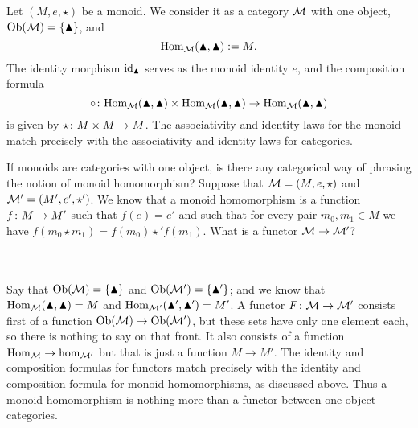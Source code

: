 \documentclass[CT4S-EN-RU]{subfiles}
\begin{document}
\begin{blockENG}
Let $(M,e,\star)$ be a monoid. We consider it as a category $\mathcal{M}$ with one object, $\textnormal{Ob}(\mathcal{M})=\{\blacktriangle\}$, and $$\textnormal{Hom}_\mathcal{M}(\blacktriangle,\blacktriangle):=M.$$ The identity morphism $\textnormal{id}_\blacktriangle$ serves as the monoid identity $e$, and the composition formula $$\circ\colon\textnormal{Hom}_\mathcal{M}(\blacktriangle,\blacktriangle)\times\textnormal{Hom}_\mathcal{M}(\blacktriangle,\blacktriangle)\rightarrow\textnormal{Hom}_\mathcal{M}(\blacktriangle,\blacktriangle)$$ is given by $\star\colon M\times M\rightarrow M$. The associativity and identity laws for the monoid match precisely with the associativity and identity laws for categories.
\end{blockENG}

\begin{blockRUS}
\end{blockRUS}

\begin{blockENG}
If monoids are categories with one object, is there any categorical way of phrasing the notion of monoid homomorphism? Suppose that $\mathcal{M}=(M,e,\star)$ and $\mathcal{M}'=(M',e',\star')$. We know that a monoid homomorphism is a function $f\colon M\rightarrow M'$ such that $f(e)=e'$ and such that for every pair $m_0,m_1\in M$ we have $f(m_0\star m_1)=f(m_0)\star' f(m_1)$. What is a functor $\mathcal{M}\rightarrow\mathcal{M}'$? 
\end{blockENG}

\begin{blockRUS}
\end{blockRUS}

\paragraph{} ~\\

\begin{blockENG}
Say that $\textnormal{Ob}(\mathcal{M})=\{\blacktriangle\}$ and $\textnormal{Ob}(\mathcal{M}')=\{\blacktriangle'\}$; and we know that $\textnormal{Hom}_\mathcal{M}(\blacktriangle,\blacktriangle)=M$ and $\textnormal{Hom}_{\mathcal{M}'}(\blacktriangle',\blacktriangle')=M'$. A functor $F\colon\mathcal{M}\rightarrow\mathcal{M}'$ consists first of a function $\textnormal{Ob}(\mathcal{M})\rightarrow\textnormal{Ob}(\mathcal{M}')$, but these sets have only one element each, so there is nothing to say on that front. It also consists of a function $\textnormal{Hom}_\mathcal{M}\rightarrow\hom_{\mathcal{M}'}$ but that is just a function $M\to M'$. The identity and composition formulas for functors match precisely with the identity and composition formula for monoid homomorphisms, as discussed above. Thus a monoid homomorphism is nothing more than a functor between one-object categories. 
\end{blockENG}
\end{document}
